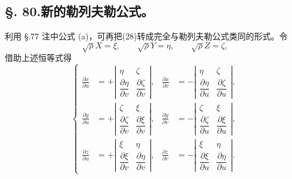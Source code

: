 
\subsection*{\S. 80.\quad 新的勒列夫勒公式。}

利用 \S.77 注中公式 (a)，可再把(28)转成完全与勒列夫勒公式类同的形式。令
\begin{equation}\tag{29}
 \sqrt\rho X=\xi,
 \qquad
 \sqrt\rho Y=\eta,
 \qquad
 \sqrt\rho Z=\zeta,
\end{equation}
借助上述恒等式得
\begin{equation}\tag{30}
\left\{
\begin{aligned}
\frac{\partial x}{\partial u}&=+\left|\begin{matrix}\eta&\zeta\\[0.25em] \dfrac{\partial\eta}{\partial v}&\dfrac{\partial\zeta}{\partial v}\end{matrix}\right|,
&
\frac{\partial x}{\partial v}&=-\left|\begin{matrix}\eta&\zeta\\[0.25em] \dfrac{\partial\eta}{\partial u}&\dfrac{\partial\zeta}{\partial u}\end{matrix}\right|,\\[0.9em]
\frac{\partial y}{\partial u}&=+\left|\begin{matrix}\zeta&\xi\\[0.25em] \dfrac{\partial\zeta}{\partial v}&\dfrac{\partial\xi}{\partial v}\end{matrix}\right|,
&
\frac{\partial y}{\partial v}&=-\left|\begin{matrix}\zeta&\xi\\[0.25em] \dfrac{\partial\zeta}{\partial u}&\dfrac{\partial\xi}{\partial u}\end{matrix}\right|,\\[0.9em]
\frac{\partial z}{\partial u}&=+\left|\begin{matrix}\xi&\eta\\[0.25em] \dfrac{\partial\xi}{\partial v}&\dfrac{\partial\eta}{\partial v}\end{matrix}\right|,
&
\frac{\partial z}{\partial v}&=-\left|\begin{matrix}\xi&\eta\\[0.25em] \dfrac{\partial\xi}{\partial u}&\dfrac{\partial\eta}{\partial u}\end{matrix}\right|.
\end{aligned}\right.
\end{equation}
